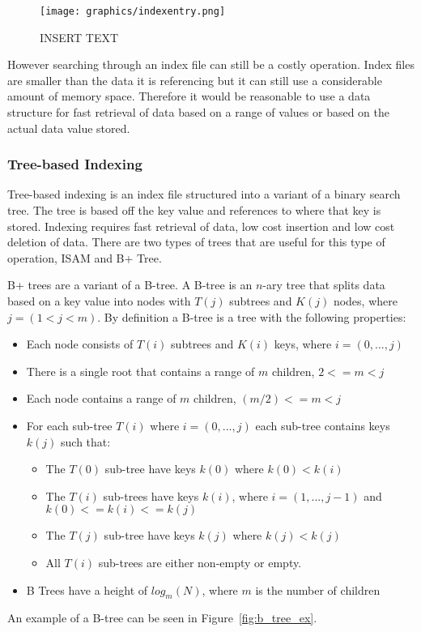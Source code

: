 \documentclass[letterpaper, 12pt]{article}
\begin{document}
\begin{figure}
  \centering
  \texttt{[image: graphics/indexentry.png]}
  \cite{ramakrishnan2000database}
  \caption{INSERT TEXT}
  \label{fig:index_entry}
\end{figure}

However searching through an index file can still be a costly operation. Index files are smaller than the
data it is referencing but it can still use a considerable amount of memory space. Therefore it would be
reasonable to use a data structure for fast retrieval of data based on a range of values or based on
the actual data value stored.
\par\vspace{\baselineskip}

\subsubsection{Tree-based Indexing}
Tree-based indexing is an index file structured into a variant of a binary search tree. The tree is based off
the key value and references to where that key is stored. Indexing requires fast retrieval of data, low cost
insertion and low cost deletion of data. There are two types of trees that are useful for this type of operation,
ISAM and B+ Tree.
\par\vspace{\baselineskip}

B+ trees are a variant of a B-tree. A B-tree is an $n$-ary tree that splits data
based on a key value into nodes with $T(j)$ subtrees and $K(j)$ nodes, where $j = (1<j<m)$.
By definition a B-tree is a tree with the following properties:
\begin{itemize}
  \item Each node consists of $T(i)$ subtrees and $K(i)$ keys, where $i = (0,...,j)$
  \item There is a single root that contains a range of $m$ children, $2<= m < j$
  \item Each node contains a range of $m$ children, $(m/2) <= m < j$
  \item For each sub-tree $T(i)$ where $i = (0,...,j)$ each sub-tree contains keys $k(j)$ such that:
  \begin{itemize}
    \item The $T(0)$ sub-tree have keys $k(0)$ where $k(0) < k(i)$
    \item The $T(i)$ sub-trees have keys $k(i)$, where $i = (1, ..., j-1)$ and $k(0) <= k(i) <= k(j)$
    \item The $T(j)$ sub-tree have keys $k(j)$ where $k(j) < k(j)$
    \item All $T(i)$ sub-trees are either non-empty or empty.
  \end{itemize}
  \item B Trees have a height of $log_m(N)$, where $m$ is the number of children
\end{itemize}
An example of a B-tree can be seen in Figure~\ref{fig:b_tree_ex}.
\end{document}
